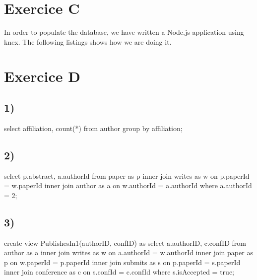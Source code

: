 \documentclass[a4paper,11pt]{report}
\begin{document}
\section*{Exercice C}

In order to populate the database, we have written a Node.js application using
knex. The following listings shows how we are doing it.

\newpage
{}

\section*{Exercice D}

\subsection*{1)}

\begin{sqlcode}
  select affiliation, count(*)
  from author
  group by affiliation;
\end{sqlcode}

\subsection*{2)}

\begin{sqlcode}
  select p.abstract, a.authorId
  from paper as p
  inner join writes as w
    on p.paperId = w.paperId
  inner join author as a
    on w.authorId = a.authorId
  where a.authorId = 2;
\end{sqlcode}

\subsection*{3)}

\begin{sqlcode}
  create view PublishesIn1(authorID, confID) as
    select a.authorID, c.confID
      from author as a
      inner join writes as w
        on a.authorId = w.authorId
      inner join paper as p
        on w.paperId = p.paperId
      inner join submits as s
        on p.paperId = s.paperId
      inner join conference as c
        on s.confId = c.confId
      where s.isAccepted = true;
\end{sqlcode}
\end{document}
